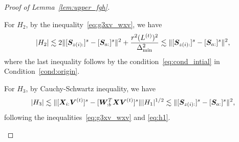 \documentclass[lettersize,journal]{IEEEtran}
\theoremstyle{definition}
\theoremstyle{definition}
\begin{document}
\begin{proof}[Proof of Lemma~\ref{lem:upper_fgh}]
\begin{enumerate}
    
    For $H_2$, by the inequality~\eqref{eq:g3xv_wxv}, we have 
    \begin{equation}\label{eq:h2}
        |H_2| \lesssim 2 \onormSize{}{ [ \mS_{z(i):} ]^s - [ \mS_{a:}]^s }^2 + \frac{r^2 (L^{(t)})^2}{\Delta_{\min}^2} \lesssim \onormSize{}{ [ \mS_{z(i):} ]^s - [ \mS_{a:}]^s }^2,
    \end{equation}
    where the last inequality follows by the condition~\eqref{eq:cond_intial} in Condition~\ref{cond:origin}.
    
    
    For $H_3$,  by Cauchy-Schwartz inequality, we have 
    \begin{equation}\label{eq:h3}
         |H_3| \lesssim \onormSize{}{[\mX_{i:} \mV^{(t)}]^s  -  [  \mW_{:b}^T \mX \mV^{(t)} ]^s} |H_1|^{1/2} \lesssim \onormSize{}{ [ \mS_{z(i):} ]^s - [ \mS_{a:}]^s }^2,
    \end{equation}
    following the inequalities~\eqref{eq:g3xv_wxv} and \eqref{eq:h1}.
    
    

\end{enumerate}
\end{proof}
\end{document}
